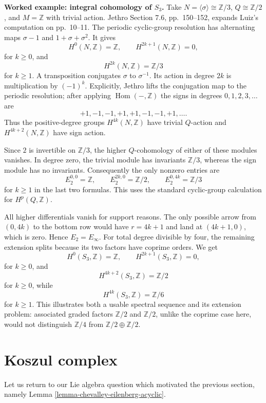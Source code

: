 \medskip\noindent
{\bf Worked example: integral cohomology
of $S_3$.}
Take $N=\langle\sigma\rangle\cong
\mathbb Z/3$, $Q\cong\mathbb Z/2$,
and $M=\mathbb Z$ with trivial action.
Jethro Section 7.6, pp.~150--152,
expands Luiz's computation on pp.~10--11.
The periodic cyclic-group resolution has
alternating maps $\sigma-1$ and
$1+\sigma+\sigma^2$. It gives
$$
H^0(N,\mathbb Z)=\mathbb Z,
\qquad H^{2k+1}(N,\mathbb Z)=0,
$$
for $k\geq0$, and
$$
H^{2k}(N,\mathbb Z)=\mathbb Z/3
$$
for $k\geq1$.
A transposition conjugates $\sigma$ to
$\sigma^{-1}$. Its action in degree
$2k$ is multiplication by $(-1)^k$.
Explicitly, Jethro lifts the conjugation
map to the periodic resolution; after
applying $\operatorname{Hom}(-,\mathbb Z)$
the signs in degrees $0,1,2,3,\ldots$ are
$$
+1,-1,-1,+1,+1,-1,-1,+1,\ldots.
$$
Thus the positive-degree groups
$H^{4k}(N,\mathbb Z)$ have trivial
$Q$-action and $H^{4k+2}(N,\mathbb Z)$
have sign action.

Since $2$ is invertible on $\mathbb Z/3$,
the higher $Q$-cohomology of either of
these modules vanishes. In degree zero,
the trivial module has invariants
$\mathbb Z/3$, whereas the sign module
has no invariants. Consequently the only
nonzero entries are
$$
E_2^{0,0}=\mathbb Z,
\qquad E_2^{2k,0}=\mathbb Z/2,
\qquad E_2^{0,4k}=\mathbb Z/3
$$
for $k\geq1$ in the last two formulas.
This uses the standard cyclic-group
calculation for $H^p(Q,\mathbb Z)$.

All higher differentials vanish for
support reasons. The only possible arrow
from $(0,4k)$ to the bottom row would
have $r=4k+1$ and land at $(4k+1,0)$,
which is zero. Hence $E_2=E_\infty$.
For total degree divisible by four, the
remaining extension splits because its
two factors have coprime orders. We get
$$
H^0(S_3,\mathbb Z)=\mathbb Z,
\qquad H^{2k+1}(S_3,\mathbb Z)=0,
$$
for $k\geq0$, and
$$
H^{4k+2}(S_3,\mathbb Z)=\mathbb Z/2
$$
for $k\geq0$, while
$$
H^{4k}(S_3,\mathbb Z)=\mathbb Z/6
$$
for $k\geq1$.
This illustrates both a usable spectral
sequence and its extension problem:
associated graded factors $\mathbb Z/2$
and $\mathbb Z/2$, unlike the coprime
case here, would not distinguish
$\mathbb Z/4$ from
$\mathbb Z/2\oplus\mathbb Z/2$.


\section{Koszul complex}
\label{section-koszul-complex}

\noindent
Let us return to our Lie algebra
question which motivated the previous
section, namely
Lemma
\ref{lemma-chevalley-eilenberg-acyclic}.

